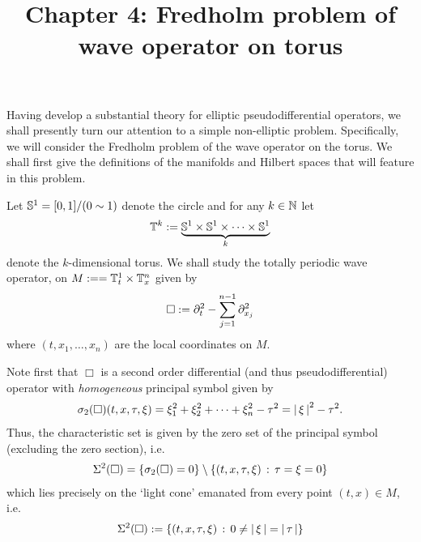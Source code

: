 \documentclass[12pt]{article}
\title{Chapter 4: Fredholm problem of wave operator on torus}
\date{}
\begin{document}
\maketitle

Having develop a substantial theory for elliptic pseudodifferential operators, we shall presently turn our attention to a simple non-elliptic problem. Specifically, we will consider the Fredholm problem of the wave operator on the torus. We shall first give the definitions of the manifolds and Hilbert spaces that will feature in this problem. \\

\begin{fdefinition} 
Let $\S^1 = [0,1] / (0 \sim 1)$ denote the circle and for any $k \in \N$ let
\begin{align*}
\T^k := \underbrace{\S^1 \times \S^1 \times \dots \times \S^1}_{k}
\end{align*}
denote the $k$-dimensional torus. We shall study the totally periodic wave operator, on $M :=  = \T_t^1 \times \T_x^{n}$ given by
\begin{align}\label{eq: d'Alembertian}
\Box := \p_t^2 - \sum_{j = 1}^{n -1} \p_{x_j}^2
\end{align}
where $(t, x_1, \dots, x_n)$ are the local coordinates on $M$. 
\end{fdefinition}
Note first that $\Box$ is a second order differential (and thus pseudodifferential) operator with \textit{homogeneous} principal symbol given by 
\begin{align*}
\sigma_2(\Box)(t, x, \tau, \xi) = \xi_1^2 + \xi_2^2 + \dots + \xi_{n}^2 - \tau^2 = \abs{\xi}^2 - \tau^2. 
\end{align*}
Thus, the characteristic set is given by the zero set of the principal symbol (excluding the zero section), i.e. 
\begin{align*}
\Char^2(\Box) = \set{\sigma_2(\Box) = 0} \setminus \set{(t, x, \tau, \xi) \wh \tau = \xi = 0}
\end{align*}
which lies precisely on the `light cone' emanated from every point $(t, x) \in M$, i.e.  
\begin{align*}
\Char^2(\Box) := \set{(t, x, \tau, \xi) \wh 0 \neq \abs{\xi}  = \abs{\tau}} 
\end{align*} 
\end{document}
